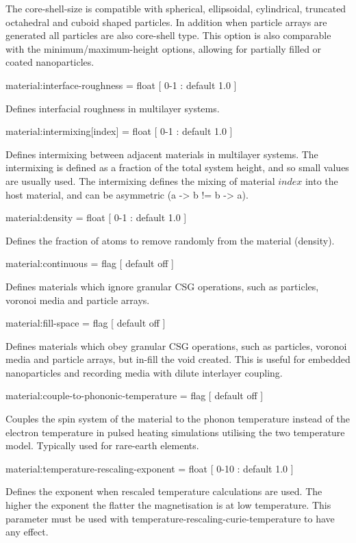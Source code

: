 The core-shell-size is compatible with spherical, ellipsoidal, cylindrical, truncated octahedral and cuboid shaped particles. In addition when particle arrays are generated all particles are also core-shell type. This option is also comparable with the minimum/maximum-height options, allowing for partially filled or coated nanoparticles.

{\zicf material:interface-roughness = float [ 0-1 : default 1.0 ]} Defines interfacial roughness in multilayer systems.

{\zicf material:intermixing[index] = float [ 0-1 : default 1.0 ]} Defines intermixing between adjacent materials in multilayer systems. The intermixing is defined as a fraction of the total system height, and so small values are usually used. The intermixing defines the mixing of material $index$ into the host material, and can be asymmetric (a -> b != b -> a).

{\zicf material:density = float [ 0-1 : default 1.0 ]} Defines the fraction of atoms to remove randomly from the material (density).

{\zicf material:continuous = flag [ default off ]} Defines materials which ignore granular CSG operations, such as particles, voronoi media and particle arrays.

{\zicf material:fill-space = flag [ default off ]} Defines materials which obey granular CSG operations, such as particles, voronoi media and particle arrays, but in-fill the void created. This is useful for embedded nanoparticles and recording media with dilute interlayer coupling.

{\zicf material:couple-to-phononic-temperature = flag [ default off ]} Couples the spin system of the material to the phonon temperature instead of the electron temperature in pulsed heating simulations utilising the two temperature model. Typically used for rare-earth elements.

{\zicf material:temperature-rescaling-exponent = float [ 0-10 : default 1.0 ]} Defines the exponent when rescaled temperature calculations are used. The higher the exponent the flatter the magnetisation is at low temperature. This parameter must be used with temperature-rescaling-curie-temperature to have any effect.

